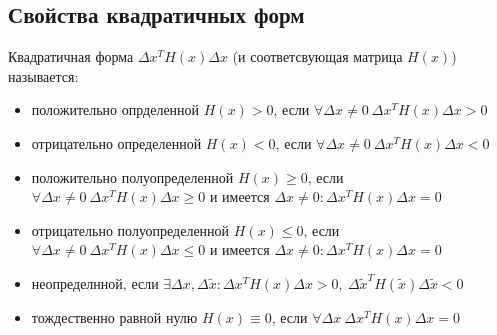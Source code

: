 \documentclass[oneside]{book}
\theoremstyle{plain}
\theoremstyle{remark}
\theoremstyle{definition}
\begin{document}
\subsection{Свойства квадратичных форм}
\label{sec:orgc2c20d7}
Квадратичная форма \(\Delta x^T H(x) \Delta x\) (и соответсвующая матрица \(H(x)\)) называется:
\begin{itemize}
\item положительно опрделенной \(H(x) > 0\), если \(\forall \Delta x \neq 0\ \Delta x^T H(x) \Delta x > 0\)
\item отрицательно определенной \(H(x) < 0\), если \(\forall \Delta x \neq 0\ \Delta x^T H(x) \Delta x < 0\)
\item положительно полуопределенной \(H(x) \ge 0\), если \(\forall \Delta x \neq 0\ \Delta x^T H(x) \Delta x \ge 0\)
и имеется \(\Delta x \neq 0: \Delta x^T H(x) \Delta x = 0\)
\item отрицательно полуопределенной \(H(x) \le 0\), если \(\forall \Delta x \neq 0\ \Delta x^T H(x) \Delta x \le 0\)
и имеется \(\Delta x \neq 0: \Delta x^T H(x) \Delta x = 0\)
\item неопределнной, если \(\exists \Delta x, \Delta \tilde{x}: \Delta x^T H(x) \Delta x > 0,\ \Delta \tilde{x}^T H(\tilde{x}) \Delta \tilde{x} < 0\)
\item тождественно равной нулю \(H(x) \equiv 0\), если \(\forall \Delta x\ \Delta x^T H(x) \Delta x = 0\)
\end{itemize}
\end{document}
